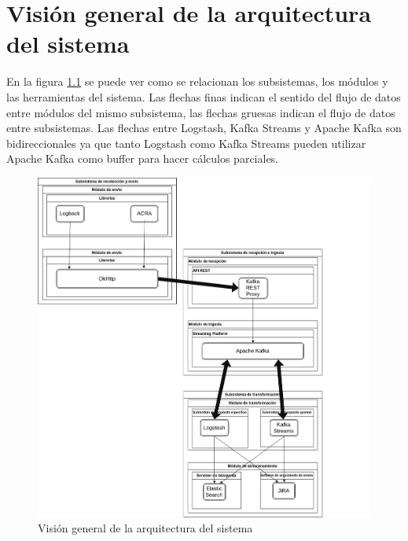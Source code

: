 \chapter{Visión general de la arquitectura del sistema}

En la figura \ref{fig:arqfinal} se puede ver como se relacionan los subsistemas, los módulos y las herramientas del sistema. Las flechas finas indican el sentido del flujo de datos entre módulos del mismo subsistema, las flechas gruesas indican el flujo de datos entre subsistemas. Las flechas entre Logstash, Kafka Streams y Apache Kafka son bidireccionales ya que tanto Logstash como Kafka Streams pueden utilizar Apache Kafka como buffer para hacer cálculos parciales. 

\begin{figure}[!htb]
	
	\includegraphics[width=\linewidth] {Moduloss-estructura-todos.png}
	\caption{Visión general de la arquitectura del sistema}
	\label{fig:arqfinal}
\end{figure}